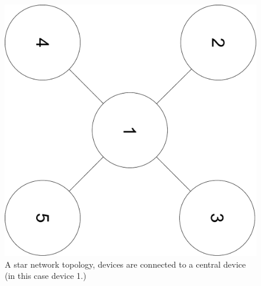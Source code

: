 \documentclass[10pt,a4paper]{article}
\begin{document}
\begin{figure}[H]
  \includegraphics[angle=90,width=\linewidth]{STAR}
  \caption{A star network topology, devices are connected to a central device (in this case device 1.)}\label{fig:STAR}
\endminipage\hfill
{}

\end{figure}
\end{document}
